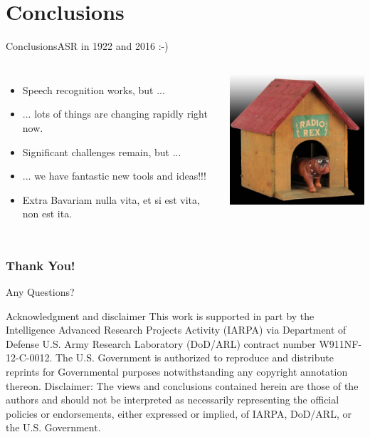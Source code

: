 \documentclass[12pt,xcolor=dvipsnames]{beamer}
\begin{document}
\section{Conclusions}
\begin{frame}{Conclusions}{ASR in 1922 and 2016 :-)}
  \begin{columns}[c]
    \column{48mm}
    \begin{itemize}
    \item Speech recognition works, but ...
    \item ... lots of things are changing rapidly right now.
    \item Significant challenges remain, but ...
    \item ... we have fantastic new tools and ideas!!!
    \item Extra Bavariam nulla vita, et si est vita, non est ita.
    \end{itemize}
    \column{60mm}
    \includegraphics[width=60mm]{figures/Rex}
  \end{columns}
\end{frame}

\begin{frame}
  \frametitle{Thank You!}
  \begin{center}
    {\color{Maroon}\Huge Any Questions?}
  \end{center}
\end{frame}


\begin{frame}{Acknowledgment and disclaimer}{}
  This work is supported in part by the Intelligence Advanced Research
  Projects Activity (IARPA) via Department of Defense U.S. Army
  Research Laboratory (DoD/ARL) contract number W911NF-12-C-0012. The
  U.S. Government is authorized to reproduce and distribute reprints
  for Governmental purposes notwithstanding any copyright annotation
  thereon.
  \vfill
  Disclaimer: The views and conclusions contained herein are
  those of the authors and should not be interpreted as necessarily
  representing the official policies or endorsements, either expressed
  or implied, of IARPA, DoD/ARL, or the U.S. Government.
\end{frame}
\end{document}
